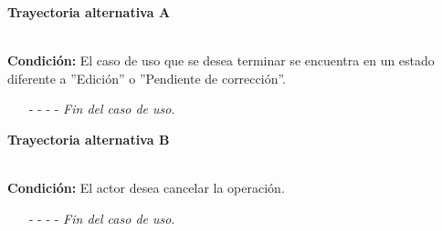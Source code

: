 \hypertarget{CU12-5:TAA}{\textbf{Trayectoria alternativa A}}\\
\noindent \textbf{Condición:} El caso de uso que se desea terminar se encuentra en un estado diferente a ''Edición'' o ''Pendiente de corrección''.
\begin{enumerate}
	\UCpaso[\UCsist] Oculta el botón  del caso que no se encuentra en estado de ''Edición'' o ''Pendiente de corrección''.
	\item[- -] - - {\em {Fin del caso de uso}}.
\end{enumerate}
\hypertarget{CU12-5:TAB}{\textbf{Trayectoria alternativa B}}\\
\noindent \textbf{Condición:} El actor desea cancelar la operación.
\begin{enumerate}
	\UCpaso[\UCactor] Oprime el botón  de la pantalla emergente.
	\UCpaso[\UCsist] Muestra la pantalla .
	\item[- -] - - {\em {Fin del caso de uso}}.%
\end{enumerate}

